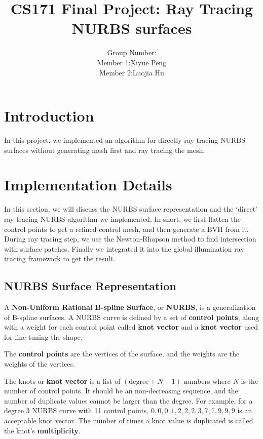 \documentclass[acmtog]{acmart}
\title{CS171 Final Project: {Ray Tracing NURBS surfaces}}
\author{Group Number:\quad 10 \\
Member 1:\quad Xiyue Peng\\
Member 2:\quad Luojia Hu
}
\begin{document}
\maketitle

\vspace*{2 ex}

\section{Introduction}

In this project, we implemented an algorithm for directly ray tracing NURBS surfaces without generating mesh first and ray tracing the mesh. %


\section{Implementation Details}

In this section, we will discuss the NURBS surface representation and the `direct' ray tracing NURBS algorithm we implemented. In short, we first flatten the control points to get a refined control mesh, and then generate a BVH from it. During ray tracing step, we use the Newton-Rhapson method to find intersection with surface patches. Finally we integrated it into the global illumination ray tracing framework to get the result. 

\subsection{NURBS Surface Representation}


A \textbf{Non-Uniform Rational B-spline Surface}, or \textbf{NURBS}, is a generalization of B-spline surfaces. A NURBS curve is defined by a set of \textbf{control points}, along with a weight for each control point called \textbf{knot vector} and a \textbf{knot vector} used for fine-tuning the shape. 

The \textbf{control points} are the vertices of the surface, and the weights are the weights of the vertices. 

The knots or \textbf{knot vector} is a list of $(\mathrm{degree}+N-1)$ numbers where $N$ is the number of control points. It should be an non-decreasing sequence, and the number of duplicate values cannot be larger than the degree. For example, for a degree 3 NURBS curve with 11 control points, $0,0,0,1,2,2,2,3,7,7,9,9,9$ is an acceptable knot vector. The number of times a knot value is duplicated is called the knot's \textbf{multiplicity}. 
\end{document}
